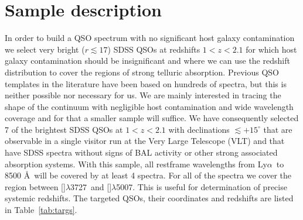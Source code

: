 \documentclass{aa}    %
\newcommand{\Tab}[1]{Table~\ref{tab:#1}}
\newcommand{\tab}[1]{\Tab{#1}}
\newcommand{\sectlabel}[1]{\label{sect:#1}}
\newcommand{\lya}{Ly$\alpha$}
\newcommand{\oii}{[\ion{O}{ii}]$\lambda$3727}
\newcommand{\oiii}{[\ion{O}{iii}]$\lambda$5007}
\begin{document}
\section{Sample description}   \sectlabel{sample}


In order to build a QSO spectrum with no significant host galaxy
contamination we select very bright ($r \lesssim 17$) SDSS QSOs at
redshifts $1 < z < 2.1$ for which host galaxy contamination should be
insignificant and where we can use the redshift distribution to cover
the regions of strong telluric absorption. Previous QSO templates in
the literature have been based on hundreds of spectra, but this is
neither possible nor necessary for us. We are mainly interested in
tracing the shape of the continuum with negligible host contamination
and wide wavelength coverage and for that a smaller sample will
suffice. We have consequently selected 7 of the brightest SDSS QSOs at
$1 < z < 2.1$ with declinations $\lesssim +15^\circ$ that are
observable in a single visitor run at the Very Large Telescope (VLT)
and that have SDSS spectra without signs of BAL activity or other
strong associated absorption systems. With this sample, all restframe
wavelengths from \lya~to 8500 \AA~will be covered by at least 4
spectra. For all of the spectra we cover the region between \oii~and
\oiii. This is useful for determination of precise systemic
redshifts. The targeted QSOs, their coordinates and redshifts are
listed in \tab{targs}.
\end{document}
